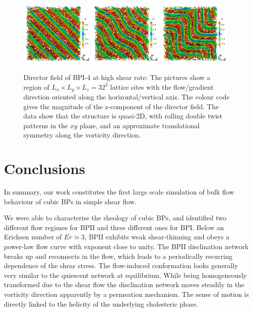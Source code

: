 \documentclass[8.5pt,twoside,twocolumn]{article}
\begin{document}
\begin{figure}[htpb]
\includegraphics[width=0.32\textwidth]{dir3d+y-450k_run916r.png}
\includegraphics[width=0.32\textwidth]{dir3d+y-510k_run916r.png}
\includegraphics[width=0.32\textwidth]{dir3d+y-800k_run916r.png}
\caption{Director field of BPI-4 at high shear rate: The pictures show a region 
of $L_x\times L_y \times L_z= 32^3$ lattice sites with the flow/gradient 
direction oriented along the horizontal/vertical axis. 
The colour code gives the magnitude of the z-component of the director field. 
The data show that the structure is quasi-2D, with rolling double twist
patterns in the $xy$ plane, and an approximate translational symmetry 
along the vorticity direction.}
\label{bp1-high}
\end{figure}



\section{Conclusions}

In summary, our work constitutes the first large scale simulation of bulk flow behaviour 
of cubic BPs in simple shear flow. 
  
We were able to characterise the rheology of cubic BPs, and identified 
two different flow regimes for BPII and three different ones for BPI. 
Below an Ericksen number of $Er\simeq3$, BPII exhibits weak shear-thinning and 
obeys a power-law flow curve with exponent close to unity.  
The BPII disclination network breaks up and reconnects 
in the flow, which leads to a periodically recurring dependence 
of the shear stress. The flow-induced conformation looks generally
very similar to the quiescent network at equilibrium. 
While being homogeneously transformed due to the shear flow
the disclination network moves steadily in the vorticity direction
apparently by a permeation mechanism. The sense of
motion is directly linked to the helicity of the underlying cholesteric phase.
\end{document}
